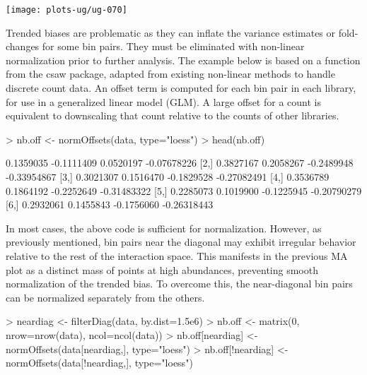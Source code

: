 \documentclass[12pt]{report}
\renewenvironment{Schunk}{\vspace{0pt}}{\vspace{0pt}}
\newcommand{\csaw}{csaw}
\begin{document}
\begin{center}
\texttt{[image: plots-ug/ug-070]}
\end{center}

Trended biases are problematic as they can inflate the variance estimates or fold-changes for some bin pairs. 
They must be eliminated with non-linear normalization prior to further analysis.
The example below is based on a function from the \csaw{} package, adapted from existing non-linear methods to handle discrete count data. %
An offset term is computed for each bin pair in each library, for use in a generalized linear model (GLM). 
A large offset for a count is equivalent to downscaling that count relative to the counts of other libraries. 

\begin{Schunk}
\begin{Sinput}
> nb.off <- normOffsets(data, type="loess")
> head(nb.off)
\end{Sinput}
\begin{Soutput}
          [,1]       [,2]       [,3]        [,4]
[1,] 0.1359035 -0.1111409  0.0520197 -0.07678226
[2,] 0.3827167  0.2058267 -0.2489948 -0.33954867
[3,] 0.3021307  0.1516470 -0.1829528 -0.27082491
[4,] 0.3536789  0.1864192 -0.2252649 -0.31483322
[5,] 0.2285073  0.1019900 -0.1225945 -0.20790279
[6,] 0.2932061  0.1455843 -0.1756060 -0.26318443
\end{Soutput}
\end{Schunk}

In most cases, the above code is sufficient for normalization.
However, as previously mentioned, bin pairs near the diagonal may exhibit irregular behavior relative to the rest of the interaction space.
This manifests in the previous MA plot as a distinct mass of points at high abundances, preventing smooth normalization of the trended bias.
To overcome this, the near-diagonal bin pairs can be normalized separately from the others.

\begin{Schunk}
\begin{Sinput}
> neardiag <- filterDiag(data, by.dist=1.5e6)
> nb.off <- matrix(0, nrow=nrow(data), ncol=ncol(data))
> nb.off[neardiag] <- normOffsets(data[neardiag,], type="loess")
> nb.off[!neardiag] <- normOffsets(data[!neardiag,], type="loess")
\end{Sinput}
\end{Schunk}
\end{document}
